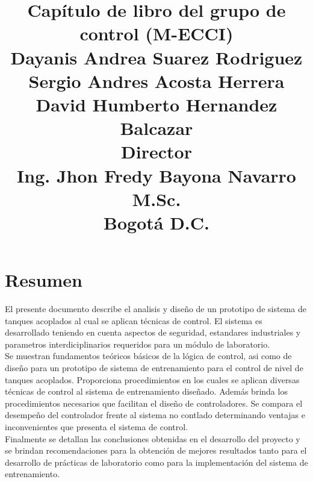 \documentclass[a4paper,12pt,twoside]{proyectotanquesecci}
\title
{
\textbf{Capítulo de libro del grupo de control (M-ECCI)}\\
\vspace{3cm}
{\large 
Dayanis Andrea Suarez Rodriguez\\
Sergio Andres Acosta Herrera \\
David Humberto Hernandez Balcazar\\}
\vspace{1cm}
\textbf{Director}\\
{\large Ing. Jhon Fredy Bayona Navarro M.Sc.}\\
\vspace{2cm}
{\large Bogotá D.C.}
}
\begin{document}
\maketitle
\renewcommand{\contentsname}{Tabla de Contenido}
\renewcommand{\listfigurename}{Lista de Figuras}
\tableofcontents
\listoffigures







\chapter*{Resumen}

El presente documento describe el analisis y diseño de un prototipo de sistema de tanques acoplados al cual se aplican técnicas de control. El sistema es desarrollado teniendo en cuenta aspectos de seguridad, estandares industriales y parametros interdiciplinarios requeridos para un módulo de laboratorio. \\

Se muestran fundamentos teóricos básicos de la lógica de control, asi como de diseño para un prototipo de sistema de entrenamiento para el control de nivel de tanques acoplados. Proporciona procedimientos en los cuales se aplican diversas técnicas de control al sistema de entrenamiento diseñado. Además brinda los procedimientos necesarios que facilitan el diseño de controladores. Se compara el desempeño del controlador frente al sistema no contlado determinando ventajas e inconvenientes que presenta el sistema de control. \\

Finalmente se detallan las conclusiones obtenidas en el desarrollo del proyecto y se brindan recomendaciones para la obtención de mejores resultados tanto para el desarrollo de prácticas de laboratorio como para la implementación del sistema de entrenamiento. \\







\end{document}
